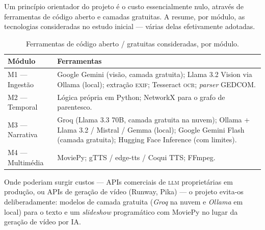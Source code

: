 Um princípio orientador do projeto é o custo essencialmente nulo, através
de ferramentas de código aberto e camadas gratuitas. A
 resume, por módulo, as tecnologias consideradas no
estudo inicial — várias delas efetivamente adotadas.

\begin{table}[H]
\centering
\caption{Ferramentas de código aberto / gratuitas consideradas, por
módulo.}
\label{tab:ferramentas}
\small
\begin{tabularx}{\linewidth}{@{}p{3.4cm}Y@{}}
\toprule
\textbf{Módulo} & \textbf{Ferramentas} \\
\midrule
M1 — Ingestão & Google Gemini (visão, camada gratuita); Llama 3.2 Vision
via Ollama (local); extração \textsc{exif}; Tesseract \textsc{ocr};
\emph{parser} GEDCOM. \\
M2 — Temporal & Lógica própria em Python; NetworkX para o grafo de
parentesco. \\
M3 — Narrativa & Groq (Llama 3.3 70B, camada gratuita na nuvem); Ollama +
Llama 3.2 / Mistral / Gemma (local); Google Gemini Flash (camada gratuita);
Hugging Face Inference (com limites). \\
M4 — Multimédia & MoviePy; gTTS / edge-tts / Coqui TTS; FFmpeg. \\
\bottomrule
\end{tabularx}
\end{table}

\noindent Onde poderiam surgir custos — APIs comerciais de \textsc{llm}
proprietárias em produção, ou APIs de geração de vídeo (Runway, Pika) —
o projeto evita-os deliberadamente: modelos de camada gratuita (\emph{Groq}
na nuvem e \emph{Ollama} em local) para o texto e um \emph{slideshow}
programático com MoviePy no lugar da geração de vídeo por IA.
